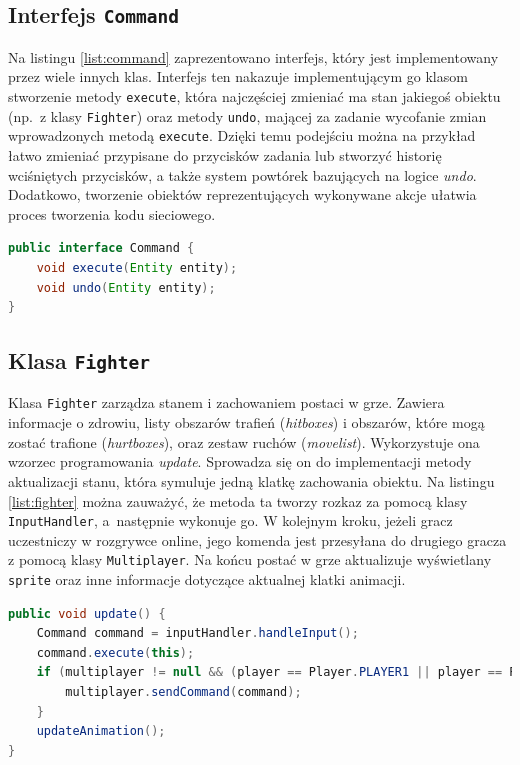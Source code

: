 \subsection{Interfejs \texttt{Command}}
Na listingu \ref{list:command} zaprezentowano interfejs, który jest implementowany przez wiele innych klas. Interfejs ten nakazuje implementującym go klasom stworzenie metody \texttt{execute}, która najczęściej zmieniać ma stan jakiegoś obiektu (np.\ z klasy \texttt{Fighter}) oraz metody \texttt{undo}, mającej za zadanie wycofanie zmian wprowadzonych metodą \texttt{execute}. Dzięki temu podejściu można na przykład łatwo zmieniać przypisane do przycisków zadania lub stworzyć historię wciśniętych przycisków, a także system powtórek bazujących na logice \emph{undo}. Dodatkowo, tworzenie obiektów reprezentujących wykonywane akcje ułatwia proces tworzenia kodu sieciowego.
\begin{lstlisting}[language=Java,style=JavaStyle,label=list:command,caption=Interfejs \texttt{Command},
                   basicstyle=\footnotesize\ttfamily]
public interface Command {
    void execute(Entity entity);
    void undo(Entity entity);
}
\end{lstlisting}

\subsection{Klasa \texttt{Fighter}}
Klasa \texttt{Fighter} zarządza stanem i zachowaniem postaci w grze. Zawiera informacje o zdrowiu, listy obszarów trafień (\emph{hitboxes}) i obszarów, które mogą zostać trafione (\emph{hurtboxes}), oraz zestaw ruchów (\emph{movelist}). Wykorzystuje ona wzorzec programowania \emph{update}. Sprowadza się on do implementacji metody aktualizacji stanu, która symuluje jedną klatkę zachowania obiektu. Na listingu \ref{list:fighter} można zauważyć, że metoda ta tworzy rozkaz za pomocą klasy \texttt{InputHandler}, a~następnie wykonuje go. W kolejnym kroku, jeżeli gracz uczestniczy w rozgrywce online, jego komenda jest przesyłana do drugiego gracza z pomocą klasy \texttt{Multiplayer}. Na końcu postać w grze aktualizuje wyświetlany \texttt{sprite} oraz inne informacje dotyczące aktualnej klatki animacji.

\begin{lstlisting}[language=Java,style=JavaStyle,label=list:fighter,caption=Funkcja update w klasie Fighter,
                   basicstyle=\footnotesize\ttfamily]
public void update() {
    Command command = inputHandler.handleInput();
    command.execute(this);
    if (multiplayer != null && (player == Player.PLAYER1 || player == Player.PLAYER2)) {
        multiplayer.sendCommand(command);
    }
    updateAnimation();
}
\end{lstlisting}


